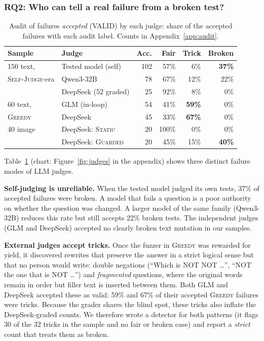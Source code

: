 \documentclass[sigconf]{acmart}
\newcommand{\HW}{\textsc{Static}}
\newcommand{\SJ}{\textsc{Self-Judge}}
\newcommand{\BOLD}{\textsc{Greedy}}
\newcommand{\BR}{\textsc{Guarded}}
\begin{document}
\subsubsection{RQ2: Who can tell a real failure from a broken test?}
\label{sec:rq2}

\begin{table}[t]
\centering
\caption{Audit of failures \emph{accepted} (VALID) by each judge: share of the accepted failures with each audit label.
Counts in Appendix~\ref{app:audit}.}
\label{tab:judges}
\small
\setlength{\tabcolsep}{3.5pt}
\begin{tabular}{@{}llrrrr@{}}
\toprule
Sample & Judge & Acc. & Fair & Trick & Broken \\
\midrule
150 text, & Tested model (self) & 102 & 57\% & 6\% & \textbf{37\%} \\
\SJ{}-era & Qwen3-32B & 78 & 67\% & 12\% & 22\% \\
 & DeepSeek (52 graded) & 25 & 92\% & 8\% & 0\% \\
\midrule
60 text, & GLM (in-loop) & 54 & 41\% & \textbf{59\%} & 0\% \\
\BOLD{} & DeepSeek & 45 & 33\% & \textbf{67\%} & 0\% \\
\midrule
40 image & DeepSeek: \HW{} & 20 & 100\% & 0\% & 0\% \\
 & DeepSeek: \BR{} & 20 & 45\% & 15\% & \textbf{40\%} \\
\bottomrule
\end{tabular}
\end{table}



Table~\ref{tab:judges} (chart: Figure~\ref{fig:judges} in the appendix) shows three distinct failure modes of LLM judges.

\textbf{Self-judging is unreliable.} When the tested model judged its own tests, 37\% of accepted failures were broken.
A model that fails a question is a poor authority on whether the question was changed. A larger model of the same family
(Qwen3-32B) reduces this rate but still accepts 22\% broken tests. The independent judges (GLM and DeepSeek) accepted no
clearly broken text mutation in our samples.

\textbf{External judges accept tricks.} Once the fuzzer in \BOLD{} was rewarded for yield, it discovered rewrites that
preserve the answer in a strict logical sense but that no person would write: double negations (``Which is NOT NOT
\dots'', ``NOT the one that is NOT \dots'') and \emph{fragmented} questions, where the original words remain in order
but filler text is inserted between them. Both GLM and DeepSeek accepted these as valid: 59\% and 67\% of their
accepted \BOLD{} failures were tricks. Because the grader shares the blind spot, these tricks also inflate the
DeepSeek-graded counts. We therefore wrote a detector for both patterns (it flags 30 of the 32 tricks in the sample and
no fair or broken case) and report a \emph{strict} count that treats them as broken.
\end{document}
